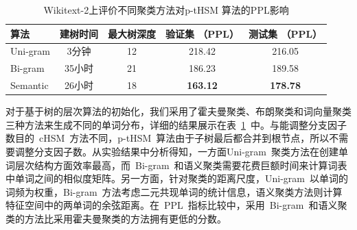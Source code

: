 \begin{table}[!ht]
  \centering
   \caption{Wikitext-2上评价不同聚类方法对p-tHSM 算法的PPL影响\label{table:p-thsm}}
  \begin{tabular}{lcccc} \toprule
  算法  &建树时间&最大树深度 &验证集 （PPL） & 测试集 （PPL）  \\ \midrule
  Uni-gram  &3分钟&12 &218.42& 216.05     \\
  Bi-gram  &35小时&21& 186.23& 189.58\\
  Semantic &26小时 &18& \textbf{163.12} & \textbf{178.78}\\
\bottomrule
  \end{tabular}
\end{table}

对于基于树的层次算法的初始化，我们采用了霍夫曼聚类、布朗聚类和词向量聚类三种方法来生成不同的单词分布，详细的结果展示在表~\ref{table:p-thsm}~中。与能调整分支因子数目的~cHSM~方法不同，p-tHSM~算法由于子树最后都合并到根节点，所以不需要调整分支因子数。从实验结果中分析得知，一方面Uni-gram~聚类方法在创建单词层次结构方面效率最高，而~Bi-gram~和语义聚类需要花费巨额时间来计算词表中单词之间的相似度矩阵。另一方面，针对聚类的距离尺度，Uni-gram~以单词的词频为权重，Bi-gram~方法考虑二元共现单词的统计信息，语义聚类方法则计算特征空间中的两单词的余弦距离。在~PPL~指标比较中，采用~Bi-gram~和语义聚类的方法比采用霍夫曼聚类的方法拥有更低的分数。

